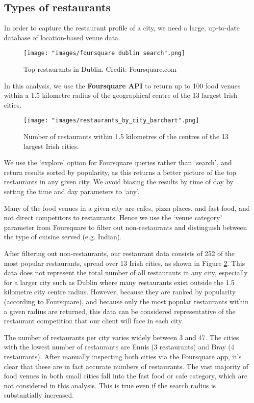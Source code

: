 \documentclass[a4paper,11pt]{article}
\begin{document}
\subsection{Types of restaurants}\label{sec: restaurant data}
In order to capture the restaurant profile of a city, we need a large, up-to-date database of location-based venue data. 
\begin{figure}[H]
   \centering
   \texttt{[image: "images/foursquare dublin search".png]}
      \caption{Top restaurants in Dublin. Credit: Foursquare.com}
      \label{fig:dublin foursquare}
\end{figure}
In this analysis, we use the \textbf{Foursquare API} to return up to 100 food venues within a 1.5 kilometre radius of the geographical centre of the 13 largest Irish cities.
%
\begin{figure}[H]
   \centering
   \texttt{[image: "images/restaurants\_by\_city\_barchart".png]}
      \caption{Number of restaurants within 1.5 kilometres of the centres of the 13 largest Irish cities. }
      \label{fig:restaurants}
\end{figure}
%

We use the `explore' option for Foursquare queries rather than `search', and return results sorted by popularity, as this returns a better picture of the top restaurants in any given city. We avoid biasing the results by time of day by setting the time and day parameters to `any'.

Many of the food venues in a given city are cafes, pizza places, and fast food, and not direct competitors to restaurants. Hence we use the `venue category' parameter from Foursquare to filter out non-restaurants and distinguish between the type of cuisine served (e.g. Indian).

After filtering out non-restaurants, our restaurant data consists of 252 of the most popular restaurants, spread over 13 Irish cities, as shown in Figure \ref{fig:restaurants}. This data does not represent the total number of all restaurants in any city, especially for a larger city such as Dublin where many restaurants exist outside the 1.5 kilometre city centre radius. However, because they are ranked by popularity (according to Foursquare), and because only the most popular restaurants within a given radius are returned, this data can be considered representative of the restaurant competition that our client will face in each city. 

The number of restaurants per city varies widely between 3 and 47. The cities with the lowest number of restaurants are Ennis (3 restaurants) and Bray (4 restaurants). After manually inspecting both cities via the Foursquare app, it's clear that these are in fact accurate numbers of restaurants. The vast majority of food venues in both small cities fall into the fast food or cafe category, which are not considered in this analysis. This is true even if the search radius is substantially increased.
\end{document}
